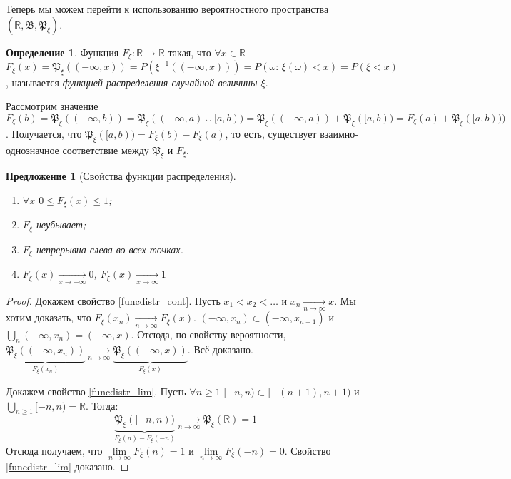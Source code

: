 \documentclass[11pt,openany,a4paper]{scrartcl}
\theoremstyle{plain}
\newtheorem{proposition}[theorem]{Предложение}
\theoremstyle{definition}
\newtheorem{definition}[theorem]{Определение}
\newcommand\mb{\mathbb}
\newcommand\real{\mb R}
\newcommand{\underto}[1]{\xrightarrow[#1]{}}
\newcommand{\distr}{\mathfrak P_\xi}
\newcommand{\funcdistr}{F_\xi}
\begin{document}
Теперь мы можем перейти к использованию вероятностного пространства
$(\real, \mathfrak B, \distr)$.

\begin{definition}
    Функция $\funcdistr: \real \to \real$ такая, что
    $\forall x\in \real$ $\funcdistr(x) = \distr((-\infty, x)) = 
    P(\xi^{-1}((-\infty, x))) = P(\omega:\, \xi(\omega) < x) = P(\xi < x)$,
    называется \emph{функцией распределения случайной величины $\xi$}.
\end{definition}

Рассмотрим значение $\funcdistr(b) = \distr((-\infty, b)) =
\distr((-\infty, a) \cup [a, b)) = \distr((-\infty,a)) + \distr([a, b)) =
\funcdistr(a) + \distr([a, b)))$. Получается, что
$\distr([a, b)) = \funcdistr(b) - \funcdistr(a)$, то есть,
существует взаимно-однозначное соответствие между $\distr$ и $\funcdistr$.

\begin{proposition}[Свойства функции распределения]
    \begin{enumerate}
        \item $\forall x$ $0\leqslant \funcdistr(x) \leqslant 1$;
        \item $\funcdistr$ неубывает;
        \item\label{funcdistr_cont} $\funcdistr$ непрерывна слева во всех точках.
        \item\label{funcdistr_lim} $\funcdistr(x) \underto{x \to -\infty} 0$,
        $\funcdistr(x) \underto{x \to \infty} 1$
    \end{enumerate}
\end{proposition}
\begin{proof}
    Докажем свойство \ref{funcdistr_cont}.
    Пусть $x_1 < x_2 < \ldots$ и $x_n \underto{n \to \infty} x$.
    Мы хотим доказать, что $\funcdistr(x_n) \underto{n \to \infty} \funcdistr(x)$.
    $(-\infty, x_n) \subset (-\infty, x_{n+1})$ и $\bigcup\limits_n(-\infty, x_n)
    = (-\infty, x)$. Отсюда, по свойству вероятности,
    $\underbrace{\distr((-\infty, x_n))}_{\funcdistr(x_n)}
    \underto{n \to \infty} \underbrace{\distr((-\infty, x))}_{\funcdistr(x)}$.
    Всё доказано.
    
    Докажем свойство \ref{funcdistr_lim}.
    Пусть $\forall n \geqslant 1$ $[-n, n) \subset [-(n+1), n+1)$ и
    $\bigcup\limits_{n \geqslant 1}[-n, n) = \real$. Тогда:
    $$
    \underbrace{\distr([-n, n))}_{\funcdistr(n) - \funcdistr(-n)}
    \underto{n \to \infty} \distr(\real) = 1
    $$
    Отсюда получаем, что $\lim\limits_{n \to \infty} \funcdistr(n) = 1$
    и $\lim\limits_{n \to \infty} \funcdistr(-n) = 0$. Свойство \ref{funcdistr_lim}
    доказано.
\end{proof}
\end{document}

